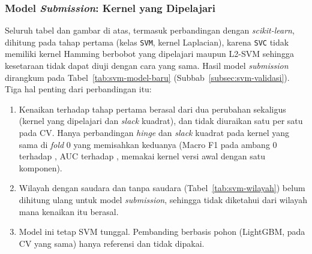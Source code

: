 \subsubsection{Model \textit{Submission}: Kernel yang Dipelajari}
Seluruh tabel dan gambar di atas, termasuk perbandingan dengan \textit{scikit-learn}, dihitung pada tahap pertama (kelas \texttt{SVM}, kernel Laplacian), karena \texttt{SVC} tidak memiliki kernel Hamming berbobot yang dipelajari maupun L2-SVM sehingga kesetaraan tidak dapat diuji dengan cara yang sama. Hasil model \textit{submission} dirangkum pada Tabel~\ref{tab:svm-model-baru} (Subbab~\ref{subsec:svm-validasi}). Tiga hal penting dari perbandingan itu:
\begin{enumerate}
	\item Kenaikan terhadap tahap pertama berasal dari dua perubahan sekaligus (kernel yang dipelajari dan \textit{slack} kuadrat), dan tidak diuraikan satu per satu pada CV. Hanya perbandingan \textit{hinge} dan \textit{slack} kuadrat pada kernel yang sama di \textit{fold} 0 yang memisahkan keduanya (Macro F1 pada ambang 0 \SVMHingeFoldF{} terhadap \SVMKuadratFoldF{}, AUC \SVMHingeFoldAUC{} terhadap \SVMKuadratFoldAUC{}, memakai kernel versi awal dengan satu komponen).
	\item Wilayah dengan saudara dan tanpa saudara (Tabel~\ref{tab:svm-wilayah}) belum dihitung ulang untuk model \textit{submission}, sehingga tidak diketahui dari wilayah mana kenaikan itu berasal.
	\item Model ini tetap SVM tunggal. Pembanding berbasis pohon (LightGBM, \SVMLightGBMCV{} pada CV yang sama) hanya referensi dan tidak dipakai.
\end{enumerate}
